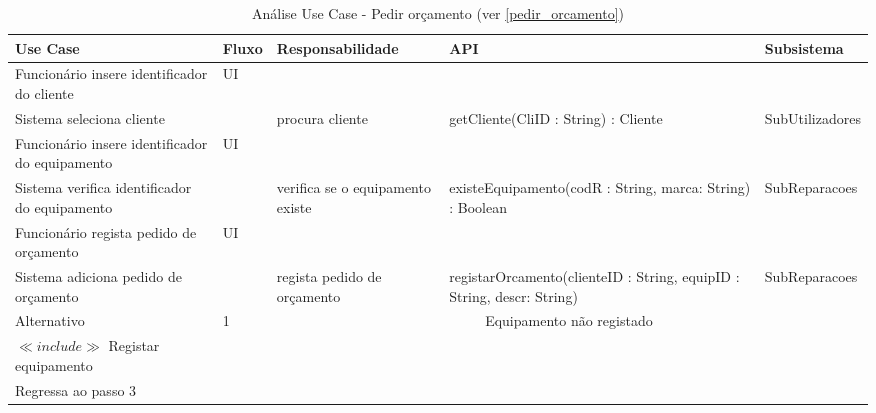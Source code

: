 \documentclass[../relatorio.tex]{subfiles}
\begin{document}
\begin{landscape}
    \begin{table}[!h]
        \centering
        \begin{tabular}{|p{5cm}|p{1cm}|p{4cm}|p{6cm}|p{3cm}|}
            \hline
            \rowcolor{gray!20!white}
            Use Case & Fluxo                                            & Responsabilidade & API & Subsistema \\
            \hline
            \rowcolor{yellow}
            Funcionário insere identificador do cliente
                     & UI
                     & 
                     & 
                     & 
            \\
            \hline
            Sistema seleciona cliente
                     & 
                     & procura cliente
                     & getCliente(CliID : String) : Cliente
                     & SubUtilizadores
            \\
            \hline
            \rowcolor{yellow}
            Funcionário insere identificador do equipamento
                     & UI
                     & 
                     & 
                     & 
            \\
            \hline
            Sistema verifica identificador do equipamento
                     & 
                     & verifica se o equipamento existe
                     & existeEquipamento(codR : String, marca: String) : Boolean
                     & SubReparacoes
            \\
            \hline
			\rowcolor{yellow}
			Funcionário regista pedido de orçamento
                     & UI
                     & 
                     & 
                     & 
            \\
            \hline
			Sistema adiciona pedido de orçamento
                     & 
                     & regista pedido de orçamento
                     & registarOrcamento(clienteID : String, equipID : String, descr: String)
                     & SubReparacoes
            \\
            \hline
            \rowcolor{green!30}
            Alternativo  & 1                                               &  \multicolumn{3}{c}{Equipamento não registado}\\
            \hline
            $\ll include \gg$ Registar equipamento
                     & 
                     & 
                     & 
                     & 
            \\
            \hline
			Regressa ao passo 3
                     & 
                     & 
                     & 
                     & 
            \\
            \hline
        \end{tabular}
        \caption{Análise Use Case - Pedir orçamento (ver \ref{pedir_orcamento})}
    \end{table}
\end{landscape}
\end{document}

